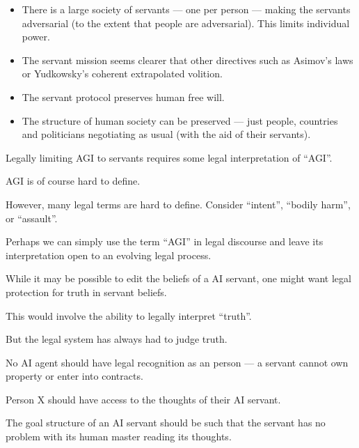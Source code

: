 {\begin{itemize}
\vfill
\item There is a large society of servants --- one per person --- making the servants adversarial (to the extent that people are adversarial).
This limits individual power.
\end{itemize}


\begin{itemize}
\item The servant mission seems clearer that other directives such as Asimov’s laws or Yudkowsky's coherent extrapolated volition.

\vfill
\item The servant protocol preserves human free will.

\vfill
\item The structure of human society can be preserved --- just people, countries and politicians negotiating as usual (with the aid of their servants).
\end{itemize}


Legally limiting AGI to servants requires some legal interpretation of ``AGI''.

\vfill
AGI is of course hard to define.

\vfill
However, many legal terms are hard to define.  Consider ``intent'', ``bodily harm'', or ``assault''.

\vfill
Perhaps we can simply use the term ``AGI'' in legal discourse and leave its interpretation open to an evolving legal process.


While it may be possible to edit the beliefs of a AI servant, one might want legal protection for truth in servant beliefs.

\vfill
This would involve the ability to legally interpret ``truth''.

\vfill
But the legal system has always had to judge truth.


No AI agent should have legal recognition as an person --- a servant cannot own property or enter into contracts.

\vfill
Person X should have access to the thoughts of their AI servant.

\vfill
The goal structure of an AI servant should be such that the servant has no problem
with its human master reading its thoughts.

}
